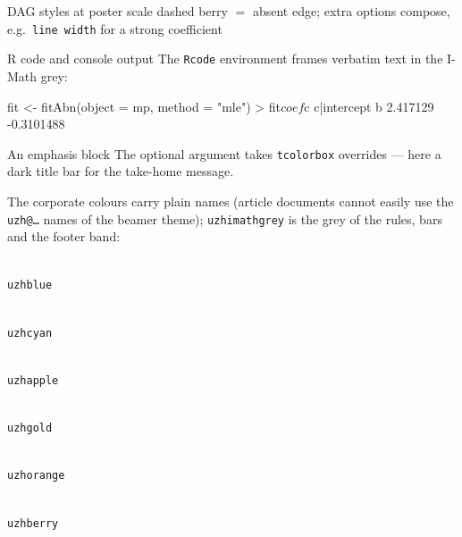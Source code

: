 \documentclass[10pt]{article}
\newcommand{\swatch}[1]{%
  \begin{minipage}[t]{0.15\linewidth}
    \centering
    {\setlength{\fboxsep}{0pt}\colorbox{#1}{\rule{0pt}{22mm}\hspace{\linewidth}}}\\[2mm]
    \footnotesize\texttt{#1}%
  \end{minipage}}
\begin{document}
\begin{posterbody}
\begin{minipage}[t]{0.31\linewidth}
\begin{posterblock}{DAG styles at poster scale}
    {\footnotesize dashed berry $=$ absent edge; extra options compose,
     e.g.\ \texttt{line width} for a strong coefficient}
  \end{posterblock}
\end{minipage}\hfill
\begin{minipage}[t]{0.31\linewidth}\vspace{0pt}
  \begin{posterblock}{R code and console output}
    The \texttt{Rcode} environment frames verbatim text in the I-Math grey:
    \begin{Rcode}
fit <- fitAbn(object = mp,
              method = "mle")
> fit$coef$c
  c|intercept          b
     2.417129 -0.3101488
    \end{Rcode}
  \end{posterblock}

  \vspace{6mm}
  \begin{posterblock}[colbacktitle=uzhgreyD, coltitle=white,
      colframe=uzhgreyD]{An emphasis block}
    The optional argument takes \texttt{tcolorbox} overrides --- here a dark
    title bar for the take-home message.
  \end{posterblock}
\end{minipage}

\vspace{12mm}


The corporate colours carry plain names (article documents cannot easily use
the \texttt{uzh@\ldots} names of the beamer theme); \texttt{uzhimathgrey} is
the grey of the rules, bars and the footer band:

\vspace{5mm}
\begin{center}
  \swatch{uzhblue}\hfill \swatch{uzhcyan}\hfill \swatch{uzhapple}\hfill
  \swatch{uzhgold}\hfill \swatch{uzhorange}\hfill \swatch{uzhberry}
\end{center}

\vspace{12mm}



\end{posterbody}
\end{document}
